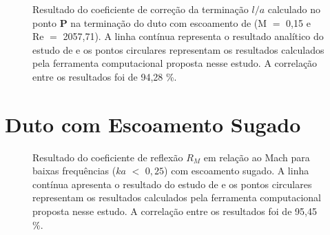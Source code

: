 \newpage
\begin{figure}[ht!]
\centering
  \caption[Coeficiente de Correção da Terminação $l/a$ com Escoamento de Exaustão (M $=$ 0,15)]{Resultado do coeficiente de correção da terminação $l/a$ calculado no ponto $\textbf{P}$ na terminação do duto com escoamento de (M $=$ 0,15 e Re $=$ 2057,71). A linha contínua representa o resultado analítico do estudo de  e os pontos circulares representam os resultados calculados pela ferramenta computacional proposta nesse estudo. A correlação entre os resultados foi de 94,28 \%.}
  \label{fig:loa_boca_015}
\end{figure}


\newpage
\section{Duto com Escoamento Sugado}

\begin{figure}[ht!]
\centering
  \caption[Coeficiente de reflexão $R_{M}$ com escoamento sugado]{Resultado do coeficiente de reflexão $R_{M}$ em relação ao Mach para baixas frequências ($ka$ $<$ $0,25$) com escoamento sugado. A linha contínua apresenta o resultado do estudo de  e os pontos circulares representam os resultados calculados pela ferramenta computacional proposta nesse estudo. A correlação entre os resultados foi de 95,45 \%.}

  \label{fig:abs_r_boca_sugado}
\end{figure}

